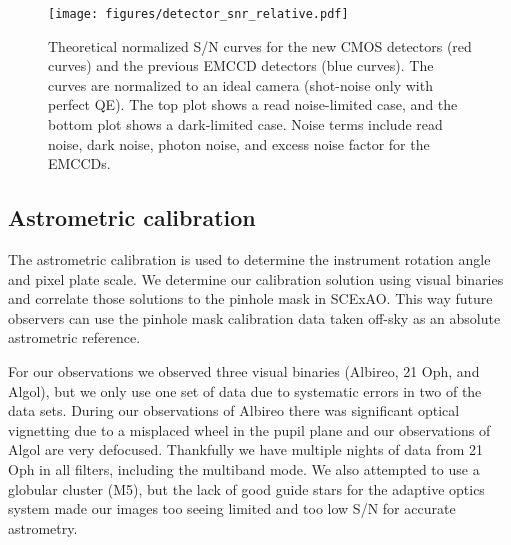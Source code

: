 

\begin{figure}
    \centering
    \texttt{[image: figures/detector\_snr\_relative.pdf]}
    \caption{Theoretical normalized S/N curves for the new CMOS detectors (red curves) and the previous EMCCD detectors (blue curves). The curves are normalized to an ideal camera (shot-noise only with perfect QE). The top plot shows a read noise-limited case, and the bottom plot shows a dark-limited case. Noise terms include read noise, dark noise, photon noise, and excess noise factor for the EMCCDs.\label{fig:detector_snr_relative}}
\end{figure}


\subsection{Astrometric calibration}

The astrometric calibration is used to determine the instrument rotation angle and pixel plate scale. We determine our calibration solution using visual binaries and correlate those solutions to the pinhole mask in SCExAO. This way future observers can use the pinhole mask calibration data taken off-sky as an absolute astrometric reference. 

For our observations we observed three visual binaries (Albireo, 21 Oph, and Algol), but we only use one set of data due to systematic errors in two of the data sets. During our observations of Albireo there was significant optical vignetting due to a misplaced wheel in the pupil plane and our observations of Algol are very defocused. Thankfully we have multiple nights of data from 21 Oph in all filters, including the multiband mode. We also attempted to use a globular cluster (M5), but the lack of good guide stars for the adaptive optics system made our images too seeing limited and too low S/N for accurate astrometry.

